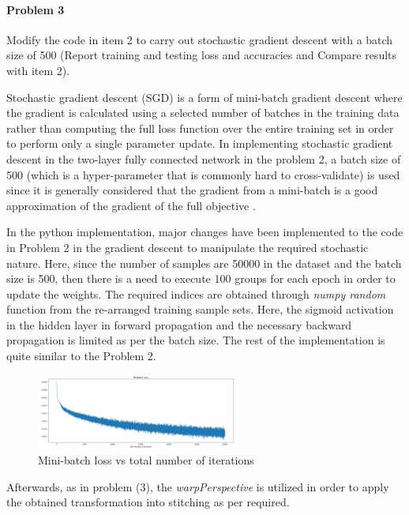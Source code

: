 \documentclass[11pt]{scrartcl}
\begin{document}
{\paragraph*{Problem 3}
Modify the code in item 2 to carry out stochastic gradient descent with a batch size of 500 (Report training and testing loss and accuracies and Compare results with item 2).

\newline Stochastic gradient descent (SGD) is a form of mini-batch gradient descent where the gradient is calculated using a selected number of batches in the training data rather than computing the full loss function over the entire training set in order to perform only a single parameter update. In implementing stochastic gradient descent in the two-layer fully connected network in the problem 2, a batch size of 500 (which is a hyper-parameter that is commonly hard to cross-validate) is used since it is generally considered that the gradient from a mini-batch is a good approximation of the gradient of the full objective \cite{web1}.

In the python implementation, major changes have been implemented to the code in Problem 2 in the gradient descent to manipulate the required stochastic nature. Here, since the number of samples are 50000 in the dataset and the batch size is 500, then there is a need to execute 100 groups for each epoch in order to update the weights. The required indices are obtained through \textit{numpy random} function from the re-arranged training sample sets. Here, the sigmoid activation in the hidden layer in forward propagation and the necessary backward propagation is limited as per the batch size. The rest of the implementation is quite similar to the Problem 2.   

\begin{figure}[H]
    \centering
    \includegraphics[width=0.6\textwidth]{3_2.PNG}
    \caption{Mini-batch loss vs total number of iterations }
    \label{fig: PaleBlueDot}    
\end{figure}

Afterwards, as in problem (3), the \textit{warpPerspective} is utilized in order to apply the obtained transformation into stitching as per required.

}
\end{document}
